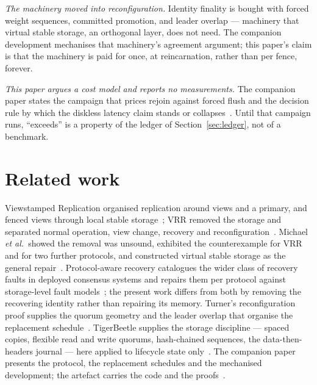 \documentclass[10pt,journal,letterpaper]{IEEEtran}
\begin{document}
\emph{The machinery moved into reconfiguration.}
Identity finality is bought with forced weight sequences, committed
promotion, and leader overlap --- machinery that virtual stable storage, an
orthogonal layer, does not need.
The companion development mechanises that machinery's agreement argument;
this paper's claim is that the machinery is paid for once, at reincarnation,
rather than per fence, forever.

\emph{This paper argues a cost model and reports no measurements.}
The companion paper states the campaign that prices rejoin against forced
flush and the decision rule by which the diskless latency claim stands or
collapses~\cite{uvrr}.
Until that campaign runs, ``exceeds'' is a property of the ledger of
Section~\ref{sec:ledger}, not of a benchmark.

\section{Related work}\label{sec:related}
Viewstamped Replication organised replication around views and a primary, and
fenced views through local stable storage~\cite{vr}; VRR removed the storage
and separated normal operation, view change, recovery and
reconfiguration~\cite{vrr}.
Michael \emph{et al.}\ showed the removal was unsound, exhibited the
counterexample for VRR and for two further protocols, and constructed virtual
stable storage as the general repair~\cite{diskless}.
Protocol-aware recovery catalogues the wider class of recovery faults in
deployed consensus systems and repairs them per protocol against
storage-level fault models~\cite{par}; the present work differs from both by
removing the recovering identity rather than repairing its memory.
Turner's reconfiguration proof supplies the quorum geometry and the leader
overlap that organise the replacement schedule~\cite{turner}.
TigerBeetle supplies the storage discipline --- spaced copies, flexible read
and write quorums, hash-chained sequences, the data-then-headers journal ---
here applied to lifecycle state only~\cite{tigerbeetle}.
The companion paper presents the protocol, the replacement schedules and the
mechanised development; the artefact carries the code and the
proofs~\cite{uvrr,artifact}.
\end{document}
